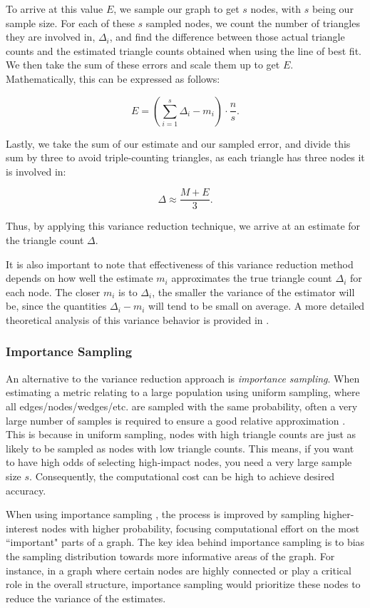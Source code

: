\documentclass[11pt, margin=1in]{article}
\begin{document}
To arrive at this value $E$, we sample our graph to get $s$ nodes, with $s$ being our sample size.
For each of these $s$ sampled nodes, we count the number of triangles they are involved in, $\Delta_i$, and find the difference between those actual triangle counts and the estimated triangle counts obtained when using the line of best fit.
We then take the sum of these errors and scale them up to get $E$.
Mathematically, this can be expressed as follows:

\[
E = \left( \sum_{i = 1}^{s} \Delta_i - m_i \right) \cdot \frac{n}{s}.
\]

Lastly, we take the sum of our estimate and our sampled error, and divide this sum by three to avoid triple-counting triangles, as each triangle has three nodes it is involved in:

\[
\Delta \approx \frac{M + E}{3}.
\]

Thus, by applying this variance reduction technique, we arrive at an estimate for the triangle count $\Delta$.

It is also important to note that effectiveness of this variance reduction method depends on how well the estimate $m_i$ approximates the true triangle count $\Delta_i$ for each node.
The closer $m_i$ is to $\Delta_i$, the smaller the variance of the estimator will be, since the quantities $\Delta_i - m_i$ will tend to be small on average.
A more detailed theoretical analysis of this variance behavior is provided in .

\subsubsection{Importance Sampling}
\label{sec:importance-sampling-background}

An alternative to the variance reduction approach is \emph{importance sampling}.
When estimating a metric relating to a large population using uniform sampling, where all edges/nodes/wedges/etc. are sampled with the same probability, often a very large number of samples is required to ensure a good relative approximation \cite{lovasz_large_2012}.
This is because in uniform sampling, nodes with high triangle counts are just as likely to be sampled as nodes with low triangle counts.
This means, if you want to have high odds of selecting high-impact nodes, you need a very large sample size $s$.
Consequently, the computational cost can be high to achieve desired accuracy.

When using importance sampling \cite{motwani_randomized_1995}, the process is improved by sampling higher-interest nodes with higher probability, focusing computational effort on the most ``important" parts of a graph.
The key idea behind importance sampling is to bias the sampling distribution towards more informative areas of the graph.
For instance, in a graph where certain nodes are highly connected or play a critical role in the overall structure, importance sampling would prioritize these nodes to reduce the variance of the estimates.
\end{document}

